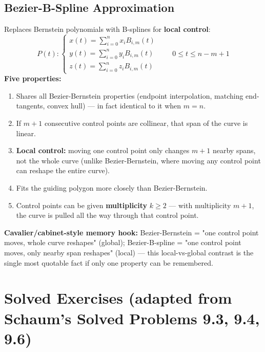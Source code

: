 \documentclass[12pt, a4paper]{article}
\newenvironment{answerbox}{\begin{mdframed}[style=answerframe]}{\end{mdframed}}
\begin{document}
\subsection{Bezier-B-Spline Approximation}
\begin{answerbox}
Replaces Bernstein polynomials with B-splines for \textbf{local control}:
$$P(t): \begin{cases}x(t)=\sum_{i=0}^{n}x_iB_{i,m}(t)\\ y(t)=\sum_{i=0}^{n}y_iB_{i,m}(t)\\ z(t)=\sum_{i=0}^{n}z_iB_{i,m}(t)\end{cases} \qquad 0\le t\le n-m+1$$
\textbf{Five properties:}
\begin{enumerate}[noitemsep]
  \item Shares all Bezier-Bernstein properties (endpoint interpolation, matching end-tangents, convex hull) --- in fact identical to it when $m=n$.
  \item If $m+1$ consecutive control points are collinear, that span of the curve is linear.
  \item \textbf{Local control:} moving one control point only changes $m+1$ nearby spans, not the whole curve (unlike Bezier-Bernstein, where moving any control point can reshape the entire curve).
  \item Fits the guiding polygon more closely than Bezier-Bernstein.
  \item Control points can be given \textbf{multiplicity} $k\ge2$ --- with multiplicity $m+1$, the curve is pulled all the way through that control point.
\end{enumerate}
\textbf{Cavalier/cabinet-style memory hook:} Bezier-Bernstein = "one control point moves, whole curve reshapes" (global); Bezier-B-spline = "one control point moves, only nearby span reshapes" (local) --- this local-vs-global contrast is the single most quotable fact if only one property can be remembered.
\end{answerbox}

\section{Solved Exercises (adapted from Schaum's Solved Problems 9.3, 9.4, 9.6)}
\end{document}
